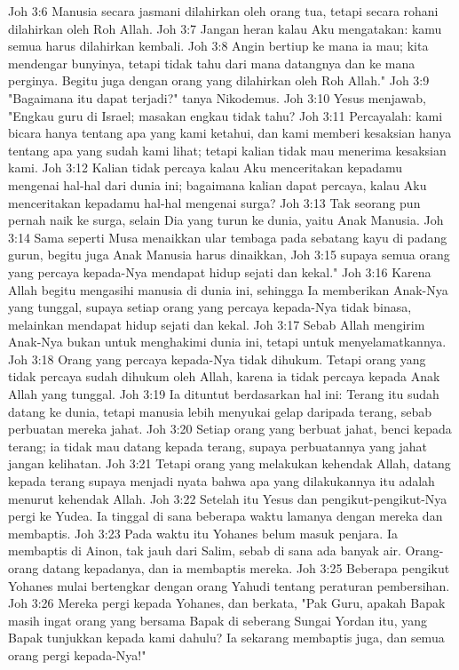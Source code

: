 Joh 3:6  Manusia secara jasmani dilahirkan oleh orang tua, tetapi secara rohani dilahirkan oleh Roh Allah.
Joh 3:7  Jangan heran kalau Aku mengatakan: kamu semua harus dilahirkan kembali.
Joh 3:8  Angin bertiup ke mana ia mau; kita mendengar bunyinya, tetapi tidak tahu dari mana datangnya dan ke mana perginya. Begitu juga dengan orang yang dilahirkan oleh Roh Allah."
Joh 3:9  "Bagaimana itu dapat terjadi?" tanya Nikodemus.
Joh 3:10  Yesus menjawab, "Engkau guru di Israel; masakan engkau tidak tahu?
Joh 3:11  Percayalah: kami bicara hanya tentang apa yang kami ketahui, dan kami memberi kesaksian hanya tentang apa yang sudah kami lihat; tetapi kalian tidak mau menerima kesaksian kami.
Joh 3:12  Kalian tidak percaya kalau Aku menceritakan kepadamu mengenai hal-hal dari dunia ini; bagaimana kalian dapat percaya, kalau Aku menceritakan kepadamu hal-hal mengenai surga?
Joh 3:13  Tak seorang pun pernah naik ke surga, selain Dia yang turun ke dunia, yaitu Anak Manusia.
Joh 3:14  Sama seperti Musa menaikkan ular tembaga pada sebatang kayu di padang gurun, begitu juga Anak Manusia harus dinaikkan,
Joh 3:15  supaya semua orang yang percaya kepada-Nya mendapat hidup sejati dan kekal."
Joh 3:16  Karena Allah begitu mengasihi manusia di dunia ini, sehingga Ia memberikan Anak-Nya yang tunggal, supaya setiap orang yang percaya kepada-Nya tidak binasa, melainkan mendapat hidup sejati dan kekal.
Joh 3:17  Sebab Allah mengirim Anak-Nya bukan untuk menghakimi dunia ini, tetapi untuk menyelamatkannya.
Joh 3:18  Orang yang percaya kepada-Nya tidak dihukum. Tetapi orang yang tidak percaya sudah dihukum oleh Allah, karena ia tidak percaya kepada Anak Allah yang tunggal.
Joh 3:19  Ia dituntut berdasarkan hal ini: Terang itu sudah datang ke dunia, tetapi manusia lebih menyukai gelap daripada terang, sebab perbuatan mereka jahat.
Joh 3:20  Setiap orang yang berbuat jahat, benci kepada terang; ia tidak mau datang kepada terang, supaya perbuatannya yang jahat jangan kelihatan.
Joh 3:21  Tetapi orang yang melakukan kehendak Allah, datang kepada terang supaya menjadi nyata bahwa apa yang dilakukannya itu adalah menurut kehendak Allah.
Joh 3:22  Setelah itu Yesus dan pengikut-pengikut-Nya pergi ke Yudea. Ia tinggal di sana beberapa waktu lamanya dengan mereka dan membaptis.
Joh 3:23  Pada waktu itu Yohanes belum masuk penjara. Ia membaptis di Ainon, tak jauh dari Salim, sebab di sana ada banyak air. Orang-orang datang kepadanya, dan ia membaptis mereka.
Joh 3:25  Beberapa pengikut Yohanes mulai bertengkar dengan orang Yahudi tentang peraturan pembersihan.
Joh 3:26  Mereka pergi kepada Yohanes, dan berkata, "Pak Guru, apakah Bapak masih ingat orang yang bersama Bapak di seberang Sungai Yordan itu, yang Bapak tunjukkan kepada kami dahulu? Ia sekarang membaptis juga, dan semua orang pergi kepada-Nya!"
